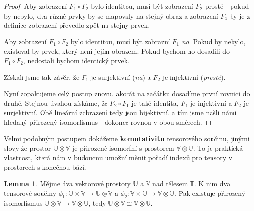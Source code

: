 \documentclass[a5paper,12pt]{amsbook}
\theoremstyle{definition}
\newtheorem{lemma}[theorem]{Lemma}
\newcommand{\myspace}[1]{\mathbb{#1}}
\begin{document}
\begin{proof}
Aby zobrazení $F_1 \circ F_2$ bylo identitou, musí být zobrazení $F_2$ prosté - pokud by nebylo,
dva různé prvky by se mapovaly na stejný obraz a zobrazení $F_1$ by je z definice zobrazení
převedlo zpět na stejný prvek.

Aby zobrazení $F_1 \circ F_2$ bylo identitou, musí být zobrazní $F_1$ \textit{na}. Pokud by nebylo,
existoval by prvek, který není jejím obrazem. Pokud bychom ho dosadili do $F_1 \circ F_2$, nedostali
bychom identický prvek.

Získali jsme tak závěr, že $F_1$ je surjektivní (\textit{na}) a $F_2$ je injektivní (\textit{prosté}).

Nyní zopakujeme celý postup znovu, akorát na začátku dosadíme první rovnici do druhé. Stejnou
úvahou získáme, že $F_2 \circ F_1$ je také identita, $F_1$ je injektivní a $F_2$ je surjektivní.
Obě lineární zobrazení tedy jsou bijektivní, a tím jsme našli námi hledaný přirozený isomorfismus
- dokonce rovnou v obou směrech.

\end{proof}

\medskip\noindent
Velmi podobným postupem dokážeme \textbf{komutativitu} tensorového součinu, jinými slovy že
prostor $\myspace{U}\otimes\myspace{V}$ je přirozeně isomorfní s prostorem
$\myspace{V}\otimes\myspace{U}$. To je praktická vlastnost, která nám v budoucnu umožní měnit
pořadí indexů pro tensory v prostorech s konečnou bází.

\begin{lemma}
Mějme dva vektorové prostory $\myspace{U}$ a $\myspace{V}$ nad tělesem $\myspace{T}$. K nim dva
tensorové součiny $\phi_1: \myspace{U}\times\myspace{V}\rightarrow\myspace{U}\otimes\myspace{V}$
a $\phi_2: \myspace{V}\times\myspace{U}\rightarrow\myspace{V}\otimes\myspace{U}$. Pak existuje
přirozený isomorfismus $\myspace{U}\otimes\myspace{V}\rightarrow\myspace{V}\otimes\myspace{U}$,
tedy $\myspace{U}\otimes\myspace{V}\cong\myspace{V}\otimes\myspace{U}$.
\end{lemma}
\end{document}
